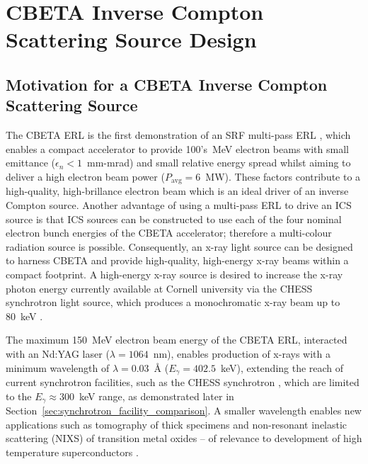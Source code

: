 \documentclass[../main.tex]{subfiles}
\begin{document}
\chapter{CBETA Inverse Compton Scattering Source Design}
\label{CBETA_Inverse_Compton_Scattering_Source_Design} %

\section{Motivation for a CBETA Inverse Compton Scattering Source}

The CBETA ERL is the first demonstration of an SRF multi-pass ERL \cite{bartnik2020cbeta}, which enables a compact accelerator to provide 100's~\si{\mega\electronvolt} electron beams with small emittance ($\epsilon_{n} < 1$~\si{\milli\meter}-\si{\milli\radian}) and small relative energy spread whilst aiming to deliver a high electron beam power ($P_{\mathrm{avg}} = 6$~\si{\mega\watt}). These factors contribute to a high-quality, high-brillance electron beam which is an ideal driver of an inverse Compton source. Another advantage of using a multi-pass ERL to drive an ICS source is that ICS sources can be constructed to use each of the four nominal electron bunch energies of the CBETA accelerator; therefore a multi-colour radiation source is possible. Consequently, an x-ray light source can be designed to harness CBETA and provide high-quality, high-energy x-ray beams within a compact footprint. A high-energy x-ray source is desired to increase the x-ray photon energy currently available at Cornell university via the CHESS synchrotron light source, which produces a monochromatic x-ray beam up to 80~\si{\kilo\electronvolt} \cite{CHESSstructuralmaterialsbeamline}. 

The maximum 150~\si{\mega\electronvolt} electron beam energy of the CBETA ERL, interacted with an Nd:YAG laser ($\lambda=1064$~\si{\nano\meter}), enables production of x-rays with a minimum wavelength of $\lambda = 0.03$~\si{\angstrom} ($E_{\gamma} = 402.5$~\si{\kilo\electronvolt}), extending the reach of current synchrotron facilities, such as the CHESS synchrotron \cite{CHESSstructuralmaterialsbeamline}, which are limited to the $E_{\gamma} \approx 300$~\si{\kilo\electronvolt} range, as demonstrated later in Section~\ref{sec:synchrotron_facility_comparison}. A smaller wavelength enables new applications such as tomography of thick specimens and non-resonant inelastic scattering (NIXS) of transition metal oxides -- of relevance to development of high temperature superconductors \cite{isaacs1996resonant}.
 
\end{document}
